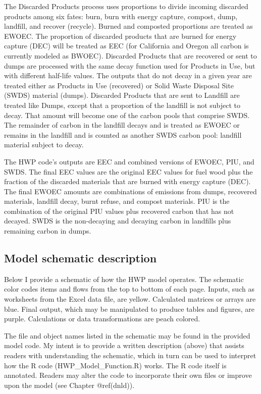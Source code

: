 \documentclass[
  openany]{book}
\begin{document}
The Discarded Products process uses proportions to divide incoming
discarded products among six fates: burn, burn with energy capture,
compost, dump, landfill, and recover (recycle). Burned and composted
proportions are treated as EWOEC. The proportion of discarded products
that are burned for energy capture (DEC) will be treated as EEC (for
California and Oregon all carbon is currently modeled as BWOEC).
Discarded Products that are recovered or sent to dumps are processed
with the same decay function used for Products in Use, but with
different half-life values. The outputs that do not decay in a given
year are treated either as Products in Use (recovered) or Solid Waste
Disposal Site (SWDS) material (dumps). Discarded Products that are sent
to Landfill are treated like Dumps, except that a proportion of the
landfill is not subject to decay. That amount will become one of the
carbon pools that comprise SWDS. The remainder of carbon in the landfill
decays and is treated as EWOEC or remains in the landfill and is counted
as another SWDS carbon pool: landfill material subject to decay.

The HWP code's outputs are EEC and combined versions of EWOEC, PIU, and
SWDS. The final EEC values are the original EEC values for fuel wood
plus the fraction of the discarded materials that are burned with energy
capture (DEC). The final EWOEC amounts are combinations of emissions
from dumps, recovered materials, landfill decay, burnt refuse, and
compost materials. PIU is the combination of the original PIU values
plus recovered carbon that has not decayed. SWDS is the non-decaying and
decaying carbon in landfills plus remaining carbon in dumps.

\hypertarget{model-func-schdesc}{%
\subsection{Model schematic description}\label{model-func-schdesc}}

Below I provide a schematic of how the HWP model operates. The schematic
color codes items and flows from the top to bottom of each page. Inputs,
such as worksheets from the Excel data file, are yellow. Calculated
matrices or arrays are blue. Final output, which may be manipulated to
produce tables and figures, are purple. Calculations or data
transformations are peach colored.

The file and object names listed in the schematic may be found in the
provided model code. My intent is to provide a written description
(above) that assists readers with understanding the schematic, which in
turn can be used to interpret how the R code (HWP\_Model\_Function.R)
works. The R code itself is annotated. Readers may alter the code to
incorporate their own files or improve upon the model (see Chapter
@ref(dnld)).
\end{document}
